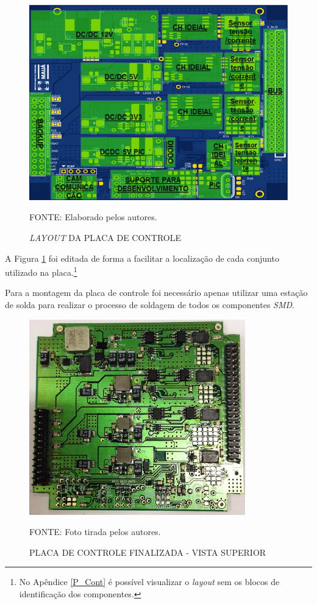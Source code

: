 \documentclass[
	12pt,				%
	openright,			%
	oneside,			%
	a4paper,			%
	english,			%
	french,				%
	spanish,			%
	brazil,				%
	oldfontcommands
	]{abntex2}
\begin{document}
	\begin{figure}[th]
		\caption{\textit{LAYOUT} DA PLACA DE CONTROLE}
		\label{Fig_pl_cont}
		\centering
		\includegraphics[width=0.6\linewidth]{./figs/pl_cont}
			
		\begin{small}
			FONTE: Elaborado pelos autores.
		\end{small}
	\end{figure}
	\pagebreak
	A Figura \ref{Fig_pl_cont} foi editada de forma a facilitar a localização de cada conjunto utilizado na placa.\footnote{No Apêndice \ref{P_Cont} é possível visualizar o \textit{layout} sem os blocos de identificação dos componentes.}
	
	Para a montagem da placa de controle foi necessário apenas utilizar uma estação de solda para realizar o processo de soldagem de todos os componentes \textit{SMD}.
	
	\begin{figure}[th]
		\caption{PLACA DE CONTROLE FINALIZADA - VISTA SUPERIOR}
		\label{Fig_esq_cont}
		\centering
		\includegraphics[width=0.6\linewidth]{./figs/cont_top}
			
		\begin{small}
			FONTE: Foto tirada pelos autores.
		\end{small}
	\end{figure}
	
\end{document}
